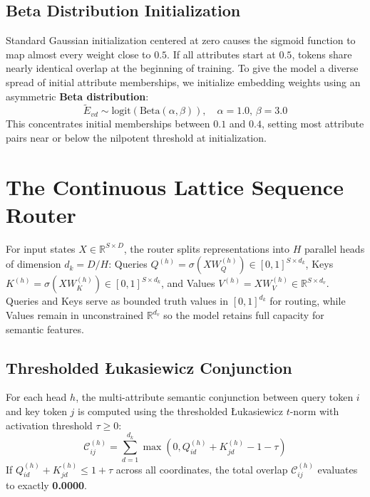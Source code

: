 \subsection{Beta Distribution Initialization}
Standard Gaussian initialization centered at zero causes the sigmoid function to map almost every weight close to $0.5$. If all attributes start at $0.5$, tokens share nearly identical overlap at the beginning of training. To give the model a diverse spread of initial attribute memberships, we initialize embedding weights using an asymmetric \textbf{Beta distribution}:
\begin{equation}
\widetilde{E}_{vd} \sim \text{logit}(\text{Beta}(\alpha, \beta)), \quad \alpha = 1.0, \, \beta = 3.0
\end{equation}
This concentrates initial memberships between $0.1$ and $0.4$, setting most attribute pairs near or below the nilpotent threshold at initialization.

\section{The Continuous Lattice Sequence Router}
For input states $X \in \mathbb{R}^{S \times D}$, the router splits representations into $H$ parallel heads of dimension $d_k = D / H$: Queries $Q^{(h)} = \sigma(X W_Q^{(h)}) \in [0, 1]^{S \times d_k}$, Keys $K^{(h)} = \sigma(X W_K^{(h)}) \in [0, 1]^{S \times d_k}$, and Values $V^{(h)} = X W_V^{(h)} \in \mathbb{R}^{S \times d_v}$. Queries and Keys serve as bounded truth values in $[0, 1]^{d_k}$ for routing, while Values remain in unconstrained $\mathbb{R}^{d_v}$ so the model retains full capacity for semantic features.

\subsection{Thresholded \L{}ukasiewicz Conjunction}
For each head $h$, the multi-attribute semantic conjunction between query token $i$ and key token $j$ is computed using the thresholded \L{}ukasiewicz $t$-norm with activation threshold $\tau \ge 0$:
\begin{equation}
\label{eq:thresholded_lukasiewicz}
\mathcal{C}_{ij}^{(h)} = \sum_{d=1}^{d_k} \max(0, Q_{id}^{(h)} + K_{jd}^{(h)} - 1 - \tau)
\end{equation}
If $Q_{id}^{(h)} + K_{jd}^{(h)} \le 1 + \tau$ across all coordinates, the total overlap $\mathcal{C}_{ij}^{(h)}$ evaluates to exactly \textbf{0.0000}.

